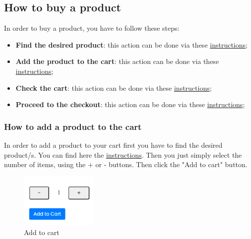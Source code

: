 \subsection{How to buy a product} \label{_buyproduct}
In order to buy a product, you have to follow these steps:
\begin{itemize} 
    \item \textbf{Find the desired product}: this action can be done via these \hyperref[_lookforproduct]{instructions};
    \item \textbf{Add the product to the cart}: this action can be done via these \hyperref[_addproduct]{instructions};
    \item \textbf{Check the cart}: this action can be done via these \hyperref[_checkcart]{instructions};
    \item \textbf{Proceed to the checkout}: this action can be done via these \hyperref[_checkout]{instructions};  
\end{itemize}

\subsubsection{How to add a product to the cart} \label{_addproduct}
In order to add a product to your cart first you have to find the desired product/s. You can find here the \hyperref[_lookforproduct]{instructions}.
Then you just simply select the number of items, using the + or - buttons. Then click the "Add to cart" button.
\begin{figure}[H]
    \centering
    \includegraphics[width=10em]{res/images/cliente/addtocart.png}
    \caption{Add to cart}
\end{figure}

